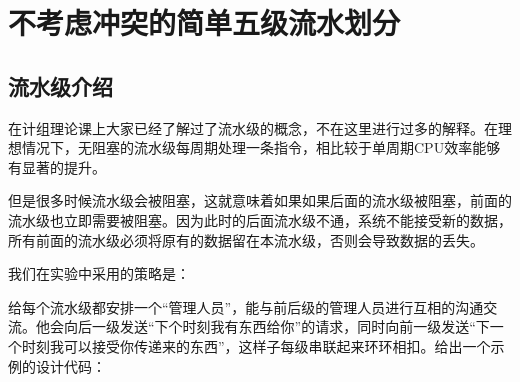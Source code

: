 \section{不考虑冲突的简单五级流水划分}\label{lab1}


\subsection{流水级介绍}

在计组理论课上大家已经了解过了流水级的概念，不在这里进行过多的解释。在理想情况下，无阻塞的流水级每周期处理一条指令，相比较于单周期CPU效率能够有显著的提升。

但是很多时候流水级会被阻塞，这就意味着如果如果后面的流水级被阻塞，前面的流水级也立即需要被阻塞。因为此时的后面流水级不通，系统不能接受新的数据，所有前面的流水级必须将原有的数据留在本流水级，否则会导致数据的丢失。

我们在实验中采用的策略是：

给每个流水级都安排一个``管理人员''，能与前后级的管理人员进行互相的沟通交流。他会向后一级发送``下个时刻我有东西给你''的请求，同时向前一级发送``下一个时刻我可以接受你传递来的东西''，这样子每级串联起来环环相扣。给出一个示例的设计代码：

